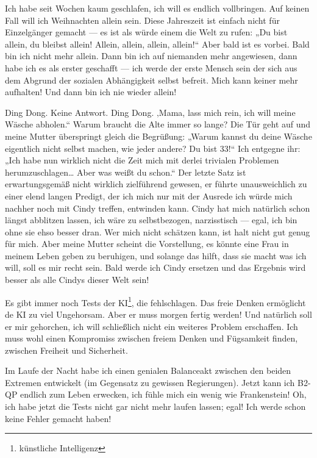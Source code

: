 Ich habe seit Wochen kaum geschlafen, ich will es endlich vollbringen. Auf keinen Fall will ich Weihnachten allein sein. Diese Jahreszeit ist einfach nicht für Einzelgänger gemacht — es ist als würde einem die Welt zu rufen: „Du bist allein, du bleibst allein! Allein, allein, allein, allein!“ Aber bald ist es vorbei. Bald bin ich nicht mehr allein. Dann bin ich auf niemanden mehr angewiesen, dann habe ich es als erster geschafft — ich werde der erste Mensch sein der sich aus dem Abgrund der sozialen Abhängigkeit selbst befreit. Mich kann keiner mehr aufhalten! Und dann bin ich nie wieder allein!

Ding Dong. Keine Antwort. Ding Dong. ‚Mama, lass mich rein, ich will meine Wäsche abholen.“ Warum braucht die Alte immer so lange? Die Tür geht auf und meine Mutter überspringt gleich die Begrüßung: „Warum kannst du deine Wäsche eigentlich nicht selbst machen, wie jeder andere? Du bist 33!“ Ich entgegne ihr: „Ich habe nun wirklich nicht die Zeit mich mit derlei trivialen Problemen herumzuschlagen… Aber was weißt du schon.“ Der letzte Satz ist erwartungsgemäß nicht wirklich zielführend gewesen, er führte unausweichlich zu einer elend langen Predigt, der ich mich nur mit der Ausrede ich würde mich nachher noch mit Cindy treffen, entwinden kann. Cindy hat mich natürlich schon längst abblitzen lassen, ich wäre zu selbstbezogen, narzisstisch — egal, ich bin ohne sie ehso besser dran. Wer mich nicht schätzen kann, ist halt nicht gut genug für mich. Aber meine Mutter scheint die Vorstellung, es könnte eine Frau in meinem Leben geben zu beruhigen, und solange das hilft, dass sie macht was ich will, soll es mir recht sein. Bald werde ich Cindy ersetzen und das Ergebnis wird besser als alle Cindys dieser Welt sein!

Es gibt immer noch Tests der KI\footnote{künstliche Intelligenz}, die fehlschlagen. Das freie Denken ermöglicht de KI zu viel Ungehorsam. Aber er muss morgen fertig werden! Und natürlich soll er mir gehorchen, ich will schließlich nicht ein weiteres Problem erschaffen. Ich muss wohl einen Kompromiss zwischen freiem Denken und Fügsamkeit finden, zwischen Freiheit und Sicherheit.

Im Laufe der Nacht habe ich einen genialen Balanceakt zwischen den beiden Extremen entwickelt (im Gegensatz zu gewissen Regierungen). Jetzt kann ich B2-QP endlich zum Leben erwecken, ich fühle mich ein wenig wie Frankenstein! Oh, ich habe jetzt die Tests nicht gar nicht mehr laufen lassen; egal! Ich werde schon keine Fehler gemacht haben!

